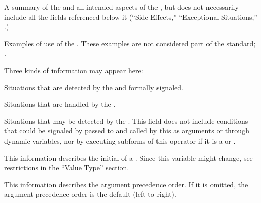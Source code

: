 \endsubsubsection%


A summary of the  and all intended aspects of the , 
but does not necessarily include all the fields referenced below it 
(``Side Effects,'' ``Exceptional Situations,'' \etc.)

\endsubsubsection%


Examples of use of the .
These examples are not considered part of the standard;
\seesection\RemovableText.

\endsubsubsection%


  Three kinds of information may appear here:
\beginlist
\item{\bull}
Situations that are detected by the  and formally signaled.
\item{\bull}
Situations that are handled by the .
\item{\bull}
Situations that may be detected by the .
\endlist
This field does not include conditions that could
be signaled by  passed to and called by this 
as arguments or through dynamic variables, nor by executing subforms of this
operator if it is a  or .

\endsubsubsection%


This information describes the initial  of a .
Since this variable might change, see  restrictions in the ``Value Type'' section.

\endsubsubsection%


This information describes the argument precedence order.
If it is omitted, the argument precedence order is the default (left to right).

